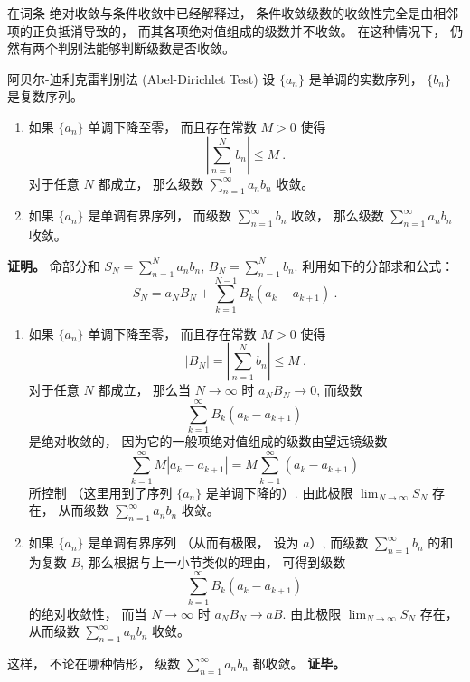 

在词条 绝对收敛与条件收敛中已经解释过， 条件收敛级数的收敛性完全是由相邻项的正负抵消导致的， 而其各项绝对值组成的级数并不收敛。 在这种情况下， 仍然有两个判别法能够判断级数是否收敛。

\begin{theorem}{阿贝尔-迪利克雷判别法 (Abel-Dirichlet Test)}
设 $\{a_n\}$ 是单调的实数序列， $\{b_n\}$ 是复数序列。

\begin{enumerate}
\item 如果 $\{a_n\}$ 单调下降至零， 而且存在常数 $M>0$ 使得
$$
\left|\sum_{n=1}^N b_n\right|\leq M~.
$$
对于任意 $N$ 都成立， 那么级数 $\sum_{n=1}^\infty a_nb_n$ 收敛。

\item 如果 $\{a_n\}$ 是单调有界序列， 而级数 $\sum_{n=1}^\infty b_n$ 收敛， 那么级数 $\sum_{n=1}^\infty a_nb_n$ 收敛。
\end{enumerate}
\end{theorem}

\textbf{证明。} 命部分和 $S_N=\sum_{n=1}^N a_nb_n$, $B_N=\sum_{n=1}^N b_n$. 利用如下的分部求和公式：
$$
S_N=a_NB_N+\sum_{k=1}^{N-1}B_k(a_{k}-a_{k+1})~.
$$

\begin{enumerate}
\item 如果 $\{a_n\}$ 单调下降至零， 而且存在常数 $M>0$ 使得
$$
|B_N|=\left|\sum_{n=1}^N b_n\right|\leq M~.
$$
对于任意 $N$ 都成立， 那么当 $N\to\infty$ 时 $a_NB_N\to0$, 而级数
$$
\sum_{k=1}^{\infty}B_k(a_{k}-a_{k+1})~
$$
是绝对收敛的， 因为它的一般项绝对值组成的级数由望远镜级数
$$
\sum_{k=1}^{\infty}M|a_{k}-a_{k+1}|
=M\sum_{k=1}^{\infty}(a_{k}-a_{k+1})~
$$
所控制 （这里用到了序列 $\{a_n\}$ 是单调下降的）. 由此极限 $\lim_{N\to\infty}S_N$ 存在， 从而级数 $\sum_{n=1}^\infty a_nb_n$ 收敛。

\item 如果 $\{a_n\}$ 是单调有界序列 （从而有极限， 设为 $a$）, 而级数 $\sum_{n=1}^\infty b_n$ 的和为复数 $B$, 那么根据与上一小节类似的理由， 可得到级数
$$
\sum_{k=1}^{\infty}B_k(a_{k}-a_{k+1})~
$$
的绝对收敛性， 而当 $N\to\infty$ 时 $a_NB_N\to aB$. 由此极限 $\lim_{N\to\infty}S_N$ 存在， 从而级数 $\sum_{n=1}^\infty a_nb_n$ 收敛。
\end{enumerate}
这样， 不论在哪种情形， 级数 $\sum_{n=1}^\infty a_nb_n$ 都收敛。 \textbf{证毕。}

